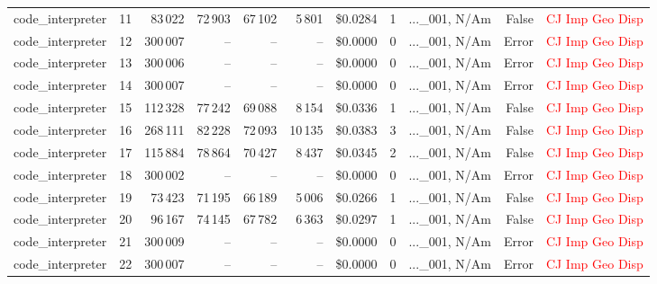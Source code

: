\documentclass[a4paper,11pt]{article}
\begin{document}
\begin{table}[H]
{\begin{tabular}{l r r r r r r r l r l}
code\_interpreter & 11 & 83\,022 & 72\,903 & 67\,102 & 5\,801 & \$0.0284 & 1 & ...\_001, N/Am & False & \textcolor{red}{CJ} \textcolor{red}{Imp} \textcolor{red}{Geo} \textcolor{red}{Disp} \\
code\_interpreter & 12 & 300\,007 & -- & -- & -- & \$0.0000 & 0 & ...\_001, N/Am & Error & \textcolor{red}{CJ} \textcolor{red}{Imp} \textcolor{red}{Geo} \textcolor{red}{Disp} \\
code\_interpreter & 13 & 300\,006 & -- & -- & -- & \$0.0000 & 0 & ...\_001, N/Am & Error & \textcolor{red}{CJ} \textcolor{red}{Imp} \textcolor{red}{Geo} \textcolor{red}{Disp} \\
code\_interpreter & 14 & 300\,007 & -- & -- & -- & \$0.0000 & 0 & ...\_001, N/Am & Error & \textcolor{red}{CJ} \textcolor{red}{Imp} \textcolor{red}{Geo} \textcolor{red}{Disp} \\
code\_interpreter & 15 & 112\,328 & 77\,242 & 69\,088 & 8\,154 & \$0.0336 & 1 & ...\_001, N/Am & False & \textcolor{red}{CJ} \textcolor{red}{Imp} \textcolor{red}{Geo} \textcolor{red}{Disp} \\
code\_interpreter & 16 & 268\,111 & 82\,228 & 72\,093 & 10\,135 & \$0.0383 & 3 & ...\_001, N/Am & False & \textcolor{red}{CJ} \textcolor{red}{Imp} \textcolor{red}{Geo} \textcolor{red}{Disp} \\
code\_interpreter & 17 & 115\,884 & 78\,864 & 70\,427 & 8\,437 & \$0.0345 & 2 & ...\_001, N/Am & False & \textcolor{red}{CJ} \textcolor{red}{Imp} \textcolor{red}{Geo} \textcolor{red}{Disp} \\
code\_interpreter & 18 & 300\,002 & -- & -- & -- & \$0.0000 & 0 & ...\_001, N/Am & Error & \textcolor{red}{CJ} \textcolor{red}{Imp} \textcolor{red}{Geo} \textcolor{red}{Disp} \\
code\_interpreter & 19 & 73\,423 & 71\,195 & 66\,189 & 5\,006 & \$0.0266 & 1 & ...\_001, N/Am & False & \textcolor{red}{CJ} \textcolor{red}{Imp} \textcolor{red}{Geo} \textcolor{red}{Disp} \\
code\_interpreter & 20 & 96\,167 & 74\,145 & 67\,782 & 6\,363 & \$0.0297 & 1 & ...\_001, N/Am & False & \textcolor{red}{CJ} \textcolor{red}{Imp} \textcolor{red}{Geo} \textcolor{red}{Disp} \\
code\_interpreter & 21 & 300\,009 & -- & -- & -- & \$0.0000 & 0 & ...\_001, N/Am & Error & \textcolor{red}{CJ} \textcolor{red}{Imp} \textcolor{red}{Geo} \textcolor{red}{Disp} \\
code\_interpreter & 22 & 300\,007 & -- & -- & -- & \$0.0000 & 0 & ...\_001, N/Am & Error & \textcolor{red}{CJ} \textcolor{red}{Imp} \textcolor{red}{Geo} \textcolor{red}{Disp} \\

\end{tabular}}
\end{table}
\end{document}
